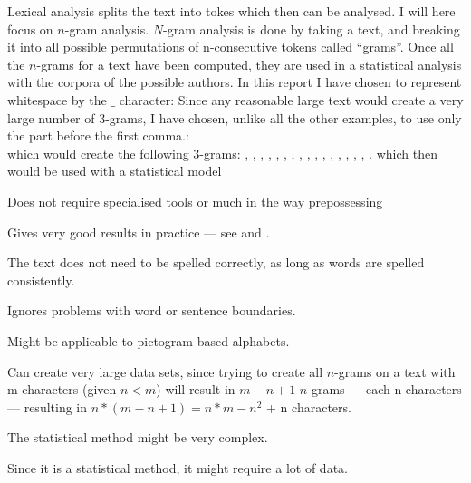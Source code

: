 {\label{character}
Lexical analysis splits the text into tokes which then can be analysed. I will here focus on $n$-gram analysis. $N$-gram analysis is done by taking a text, and breaking it into all possible permutations of n-consecutive tokens called ``grams''. Once all the $n$-grams for a text have been computed, they are used in a statistical analysis with the corpora of the possible authors. 
}
{
In this report I have chosen to represent whitespace by the $\_$ character: Since any reasonable large text would create a very large number of 3-grams, I have chosen, unlike all the other examples, to use only the part before the first comma.:\\
which would create the following 3-grams: , , , , , , , , , , , , , , , , .
which then would be used with a statistical model 
}
{
\item Does not require specialised tools or much in the way prepossessing
\item Gives very good results in practice --- see \cite{nr4} and \cite{nr3}.
\item The text does not need to be spelled correctly, as long as words are spelled consistently.
\item Ignores problems with word or sentence boundaries.
\item Might be applicable to pictogram based alphabets.  
}
{
\item Can create very large data sets, since trying to create all $n$-grams on a text with m characters (given $n < m$) will result in $m - n + 1$ $n$-grams --- each n characters --- resulting in $n * (m - n + 1) = n*m - n^2$ + n characters.
\item The statistical method might be very complex.
\item Since it is a statistical method, it might require a lot of data.
}

